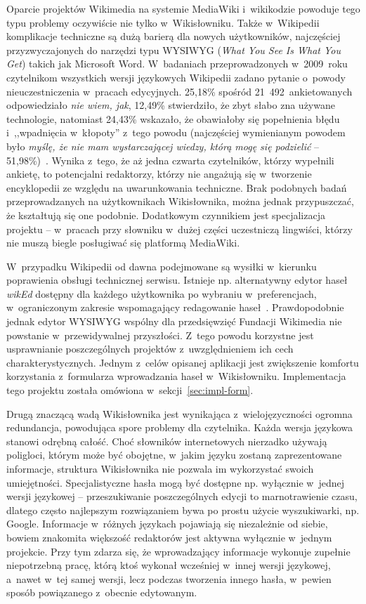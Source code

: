 Oparcie projektów Wikimedia na systemie MediaWiki i~wikikodzie powoduje tego typu problemy oczywiście nie tylko w~Wikisłowniku. Także w~Wikipedii komplikacje techniczne są dużą barierą dla nowych użytkowników, najczęściej przyzwyczajonych do narzędzi typu WYSIWYG (\emph{What You See Is What You Get}) takich jak Microsoft Word. W~badaniach przeprowadzonych w~2009~roku czytelnikom wszystkich wersji językowych Wikipedii zadano pytanie o~powody nieuczestniczenia w~pracach edycyjnych. 25,18\% spośród 21~492~ankietowanych odpowiedziało \emph{nie wiem, jak}, 12,49\% stwierdziło, że zbyt słabo zna używane technologie, natomiast 24,43\% wskazało, że obawiałoby się popełnienia błędu i~,,wpadnięcia w~kłopoty'' z~tego powodu (najczęściej wymienianym powodem było \emph{myślę, że nie mam wystarczającej wiedzy, którą mogę się podzielić} -- 51,98\%)~\cite{wiki:survey}. Wynika z~tego, że aż jedna czwarta czytelników, którzy wypełnili ankietę, to potencjalni redaktorzy, którzy nie angażują się w~tworzenie encyklopedii ze względu na uwarunkowania techniczne. Brak podobnych badań przeprowadzanych na użytkownikach Wikisłownika, można jednak przypuszczać, że kształtują się one podobnie. Dodatkowym czynnikiem jest specjalizacja projektu -- w~pracach przy słowniku w~dużej części uczestniczą lingwiści, którzy nie muszą biegle posługiwać się platformą MediaWiki.

W~przypadku Wikipedii od dawna podejmowane są wysiłki w~kierunku poprawienia obsługi technicznej serwisu. Istnieje np. alternatywny edytor haseł \emph{wikEd} dostępny dla każdego użytkownika po wybraniu w~preferencjach, w~ograniczonym zakresie wspomagający redagowanie haseł~\cite{wiki:wiked}. Prawdopodobnie jednak edytor WYSIWYG wspólny dla przedsięwzięć Fundacji Wikimedia nie powstanie w~przewidywalnej przyszłości. Z~tego powodu korzystne jest usprawnianie poszczególnych projektów z~uwzględnieniem ich cech charakterystycznych. Jednym z~celów opisanej aplikacji jest zwiększenie komfortu korzystania z~formularza wprowadzania haseł w~Wikisłowniku. Implementacja tego projektu została omówiona w~sekcji~\ref{sec:impl-form}.

Drugą znaczącą wadą Wikisłownika jest wynikająca z~wielojęzyczności ogromna redundancja, powodująca spore problemy dla czytelnika. Każda wersja językowa stanowi odrębną całość. Choć słowników internetowych nierzadko używają poligloci, którym może być obojętne, w~jakim języku zostaną zaprezentowane informacje, struktura Wikisłownika nie pozwala im wykorzystać swoich umiejętności. Specjalistyczne hasła mogą być dostępne np. wyłącznie w~jednej wersji językowej -- przeszukiwanie poszczególnych edycji to marnotrawienie czasu, dlatego często najlepszym rozwiązaniem bywa po prostu użycie wyszukiwarki, np. Google. Informacje w~różnych językach pojawiają się niezależnie od siebie, bowiem znakomita większość redaktorów jest aktywna wyłącznie w~jednym projekcie. Przy tym zdarza się, że wprowadzający informacje wykonuje zupełnie niepotrzebną pracę, którą ktoś wykonał wcześniej w~innej wersji językowej, a~nawet w~tej samej wersji, lecz podczas tworzenia innego hasła, w~pewien sposób powiązanego z~obecnie edytowanym.


